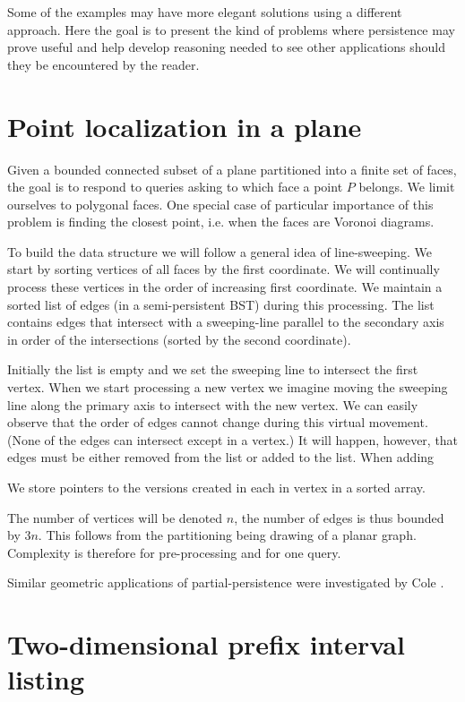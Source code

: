 Some of the examples may have more elegant solutions using a different approach. Here the goal is to present the kind of problems where persistence may prove useful and help develop reasoning needed to see other applications should they be encountered by the reader.

\section{Point localization in a plane}

Given a bounded connected subset of a plane partitioned into a finite set of faces, the goal is to respond to queries asking to which face a point $P$ belongs. We limit ourselves to polygonal faces.
One special case of particular importance of this problem is finding the closest point, i.e. when the faces are Voronoi diagrams.

To build the data structure we will follow a general idea of line-sweeping. We start by sorting vertices of all faces by the first coordinate. We will continually process these vertices in the order of increasing first coordinate. We maintain a sorted list of edges (in a semi-persistent BST) during this processing. The list contains edges that intersect with a sweeping-line parallel to the secondary axis in order of the intersections (sorted by the second coordinate). 

Initially the list is empty and we set the sweeping line to intersect the first vertex.
When we start processing a new vertex we imagine moving the sweeping line along the primary axis to intersect with the new vertex. We can easily observe that the order of edges cannot change during this virtual movement. (None of the edges can intersect except in a vertex.) It will happen, however, that edges must be either removed from the list or added to the list. When adding 

We store pointers to the versions created in each in vertex in a sorted array.

The number of vertices will be denoted $n$, the number of edges is thus bounded by $3n$. This follows from the partitioning being drawing of a planar graph. Complexity is therefore  for pre-processing and  for one query.

Similar geometric applications of partial-persistence were investigated by Cole \cite{geometric-applications}.


\section{Two-dimensional prefix interval listing}

